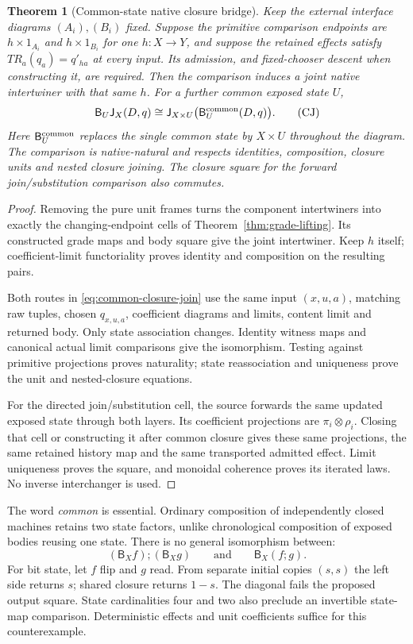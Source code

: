 \documentclass[11pt]{article}
\newtheorem{theorem}{Theorem}
\begin{document}
\begin{theorem}[Common-state native closure bridge]\label{thm:common-state-feedback}
Keep the external interface diagrams $(A_i),(B_i)$ fixed. Suppose the primitive comparison endpoints are $h\times1_{A_i}$ and $h\times1_{B_i}$ for one $h:X\to Y$, and suppose the retained effects satisfy $TR_a(q_a)=q'_{ha}$ at every input. Its admission, and fixed-chooser descent when constructing it, are required. Then the comparison induces a joint native intertwiner with that same $h$. For a further common exposed state $U$,
\[
 \mathsf B_U\mathsf J_X(D,q)
 \cong\mathsf J_{X\times U}\bigl(\mathsf B_U^{\rm common}(D,q)\bigr).
 \tag{CJ}\label{eq:common-closure-join}
\]
Here $\mathsf B_U^{\rm common}$ replaces the single common state by $X\times U$ throughout the diagram. The comparison is native-natural and respects identities, composition, closure units and nested closure joining. The closure square for the forward join/substitution comparison also commutes.
\end{theorem}
\begin{proof}
Removing the pure unit frames turns the component intertwiners into exactly the changing-endpoint cells of Theorem~\ref{thm:grade-lifting}. Its constructed grade maps and body square give the joint intertwiner. Keep $h$ itself; coefficient-limit functoriality proves identity and composition on the resulting pairs.

Both routes in \eqref{eq:common-closure-join} use the same input $(x,u,a)$, matching raw tuples, chosen $q_{x,u,a}$, coefficient diagrams and limits, content limit and returned body. Only state association changes. Identity witness maps and canonical actual limit comparisons give the isomorphism. Testing against primitive projections proves naturality; state reassociation and uniqueness prove the unit and nested-closure equations.

For the directed join/substitution cell, the source forwards the same updated exposed state through both layers. Its coefficient projections are $\pi_i\otimes\rho_i$. Closing that cell or constructing it after common closure gives these same projections, the same retained history map and the same transported admitted effect. Limit uniqueness proves the square, and monoidal coherence proves its iterated laws. No inverse interchanger is used.
\end{proof}

The word \emph{common} is essential. Ordinary composition of independently closed machines retains two state factors, unlike chronological composition of exposed bodies reusing one state. There is no general isomorphism between:
\[
 (\mathsf B_Xf);(\mathsf B_Xg)\qquad\text{and}\qquad\mathsf B_X(f;g).
 \tag{NC}\label{eq:no-independent-fusion}
\]
For bit state, let $f$ flip and $g$ read. From separate initial copies $(s,s)$ the left side returns $s$; shared closure returns $1-s$. The diagonal fails the proposed output square. State cardinalities four and two also preclude an invertible state-map comparison. Deterministic effects and unit coefficients suffice for this counterexample.
\end{document}
